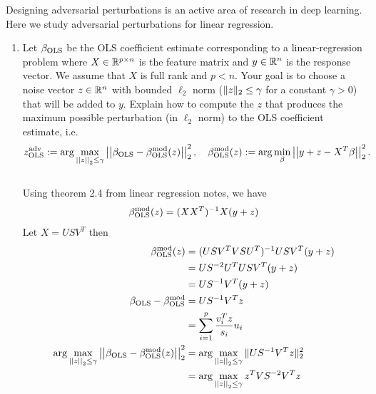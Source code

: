 \documentclass[11pt,twoside]{article}
\begin{document}
\begin{exam}
\begin{exercise}
\begin{problem}
\begin{enumerate}
\end{enumerate}
\end{problem} 
\end{exercise} 

\newpage

\item
\begin{exercise} 
\begin{problem} 
Designing adversarial perturbations is an active area of research in deep learning. Here we study adversarial perturbations for linear regression. 
\begin{enumerate}
\item Let $\beta_{\operatorname{OLS}}$ be the OLS coefficient estimate corresponding to a linear-regression problem where $X \in \mathbb{R}^{p \times n}$ is the feature matrix and $y \in \mathbb{R}^{n}$ is the response vector. We assume that $X$ is full rank and $p<n$. Your goal is to choose a noise vector $z \in \mathbb{R}^n$ with bounded $\ell_2$ norm ($\| z \| _{2}\leq \gamma$ for a constant $\gamma > 0$) that will be added to $y$. Explain how to compute the $z$ that produces the maximum possible perturbation (in $\ell_2$ norm) to the OLS coefficient estimate, i.e. 
\begin{align}
z^{\operatorname{adv}}_{\operatorname{OLS}}:= \arg \max_{\left|\left| z \right|\right| _{2} \leq \gamma} \left|\left| \beta_{\operatorname{OLS}} - \beta^{\operatorname{mod}}_{\operatorname{OLS}}(z) \right|\right| _{2}^2, \quad  \beta^{\operatorname{mod}}_{\operatorname{OLS}}(z) := \arg \min_{\beta} \left|\left| y+z - X^T\beta \right|\right| _{2}^2.
\end{align}\\

Using theorem 2.4 from linear regression notes, we have 
$$
	 \beta^{\operatorname{mod}}_{\operatorname{OLS}}(z) = ( X X^T)^{-1} X (y + z)
$$
Let $X=U S V^T$ then 
\begin{align*}
	 \beta^{\operatorname{mod}}_{\operatorname{OLS}}(z)				&= ( U S V^T V S U^T)^{-1} U S V^T (y + z) \\
	 										&= U S^{-2} U^T U S V^T (y + z) \\
											&= U S^{-1} V^T (y + z) \\
	\beta_{\operatorname{OLS}} - \beta^{\operatorname{mod}}_{\operatorname{OLS}}	&= U S^{-1} V^T z \\
											&= \sum_{i=1}^p	\frac{v_i^T z} {s_i} u_i \\
	 \arg \max_{\left|\left| z \right|\right| _{2} \leq \gamma} \left|\left| \beta_{\operatorname{OLS}} - \beta^{\operatorname{mod}}_{\operatorname{OLS}}(z) \right|\right| _{2}^2
											&= \arg \max_{\left|\left| z \right|\right| _{2} \leq \gamma} \|  U S^{-1} V^T z  \|_2^2 \\
											&=\arg \max_{\left|\left| z \right|\right| _{2} \leq \gamma}  z^T V S^{-2} V^T z \\
\end{align*}


\end{enumerate}
\end{problem}
\end{exercise}
\end{exam}
\end{document}
